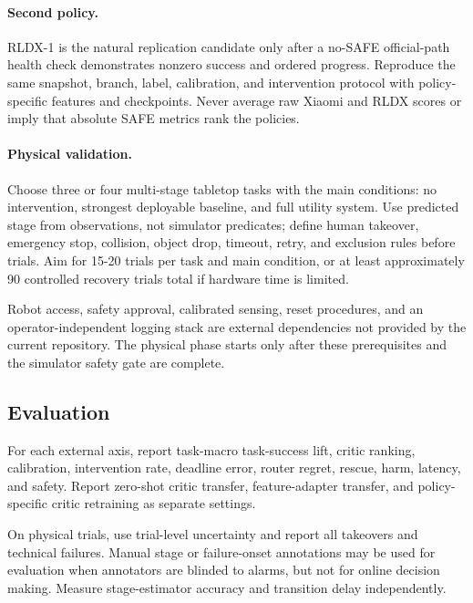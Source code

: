 \paragraph{Second policy.}
RLDX-1 is the natural replication candidate only after a no-SAFE official-path health check demonstrates nonzero success and ordered progress. Reproduce the same snapshot, branch, label, calibration, and intervention protocol with policy-specific features and checkpoints. Never average raw Xiaomi and RLDX scores or imply that absolute SAFE metrics rank the policies.

\paragraph{Physical validation.}
Choose three or four multi-stage tabletop tasks with the main conditions: no intervention, strongest deployable baseline, and full utility system. Use predicted stage from observations, not simulator predicates; define human takeover, emergency stop, collision, object drop, timeout, retry, and exclusion rules before trials. Aim for 15-20 trials per task and main condition, or at least approximately 90 controlled recovery trials total if hardware time is limited.

Robot access, safety approval, calibrated sensing, reset procedures, and an operator-independent logging stack are external dependencies not provided by the current repository. The physical phase starts only after these prerequisites and the simulator safety gate are complete.


\subsection{Evaluation}

For each external axis, report task-macro task-success lift, critic ranking, calibration, intervention rate, deadline error, router regret, rescue, harm, latency, and safety. Report zero-shot critic transfer, feature-adapter transfer, and policy-specific critic retraining as separate settings.

On physical trials, use trial-level uncertainty and report all takeovers and technical failures. Manual stage or failure-onset annotations may be used for evaluation when annotators are blinded to alarms, but not for online decision making. Measure stage-estimator accuracy and transition delay independently.

